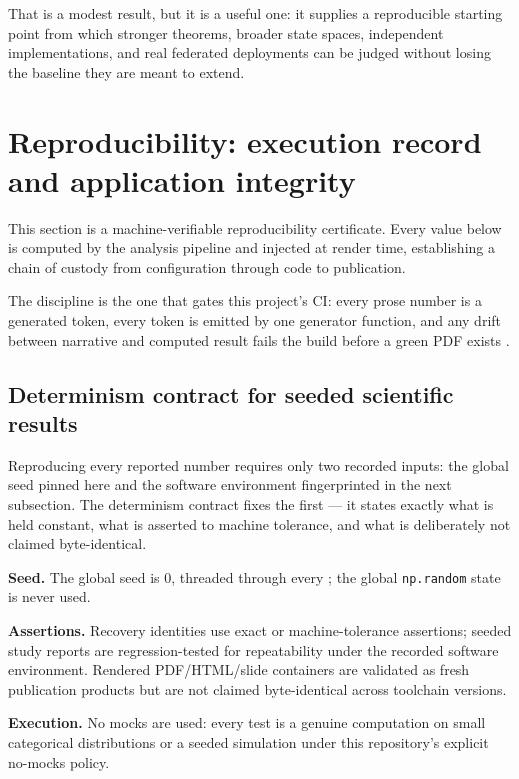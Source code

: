 \documentclass[
  english,
]{article}
\theoremstyle{plain}
\theoremstyle{definition}
\theoremstyle{remark}
\theoremstyle{definition}
\begin{document}
That is a modest result, but it is a useful one: it supplies a
reproducible starting point from which stronger theorems, broader state
spaces, independent implementations, and real federated deployments can
be judged without losing the baseline they are meant to extend.

\section{Reproducibility: execution record and application
integrity}\label{sec:reproducibility}

This section is a machine-verifiable reproducibility certificate. Every
value below is computed by the analysis pipeline and injected at render
time, establishing a chain of custody from configuration through code to
publication.

The discipline is the one that gates this project's CI: every prose
number is a generated token, every token is emitted by one generator
function, and any drift between narrative and computed result fails the
build before a green PDF exists \citep{peng2011reproducible}.

\subsection{Determinism contract for seeded scientific
results}\label{sec:repro-determinism}

Reproducing every reported number requires only two recorded inputs: the
global seed pinned here and the software environment fingerprinted in
the next subsection. The determinism contract fixes the first --- it
states exactly what is held constant, what is asserted to machine
tolerance, and what is deliberately not claimed byte-identical.

\textbf{Seed.} The global seed is 0, threaded through every
; the global \texttt{np.random}
state is never used.

\textbf{Assertions.} Recovery identities use exact or machine-tolerance
assertions; seeded study reports are regression-tested for repeatability
under the recorded software environment. Rendered PDF/HTML/slide
containers are validated as fresh publication products but are not
claimed byte-identical across toolchain versions.

\textbf{Execution.} No mocks are used: every test is a genuine
computation on small categorical distributions or a seeded simulation
under this repository's explicit no-mocks policy.
\end{document}
